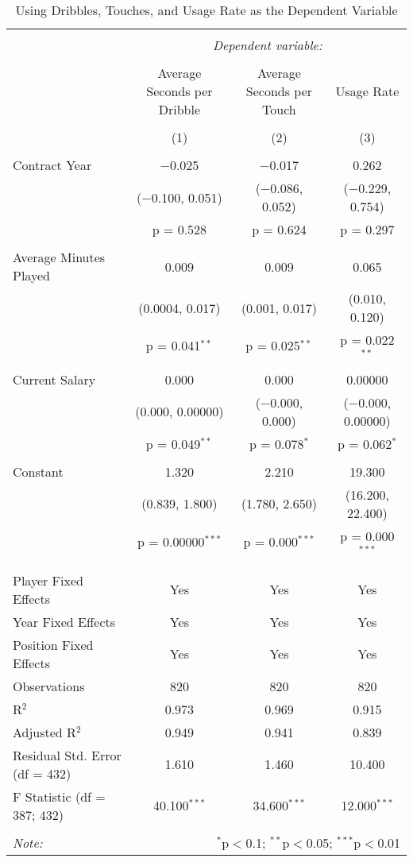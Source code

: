 \documentclass[12pt]{article}
\begin{document}
	\begin{sidewaystable}[!htbp] \centering 
		\caption{Using Dribbles, Touches, and Usage Rate as the Dependent Variable} 
		\label{} 
		\begin{tabular}{@{\extracolsep{5pt}}lccc} 
			\\[-1.8ex]\hline 
			\hline \\[-1.8ex] 
			& \multicolumn{3}{c}{\textit{Dependent variable:}} \\ 
			\cline{2-4} 
			\\[-1.8ex] & Average Seconds per Dribble & Average Seconds per Touch & Usage Rate \\ 
			\\[-1.8ex] & (1) & (2) & (3)\\ 
			\hline \\[-1.8ex] 
			Contract Year & $-$0.025 & $-$0.017 & 0.262 \\ 
			& ($-$0.100, 0.051) & ($-$0.086, 0.052) & ($-$0.229, 0.754) \\ 
			& p = 0.528 & p = 0.624 & p = 0.297 \\ 
			& & & \\ 
			Average Minutes Played & 0.009 & 0.009 & 0.065 \\ 
			& (0.0004, 0.017) & (0.001, 0.017) & (0.010, 0.120) \\ 
			& p = 0.041$^{**}$ & p = 0.025$^{**}$ & p = 0.022$^{**}$ \\ 
			& & & \\ 
			Current Salary & 0.000 & 0.000 & 0.00000 \\ 
			& (0.000, 0.00000) & ($-$0.000, 0.000) & ($-$0.000, 0.00000) \\ 
			& p = 0.049$^{**}$ & p = 0.078$^{*}$ & p = 0.062$^{*}$ \\ 
			& & & \\ 
			Constant & 1.320 & 2.210 & 19.300 \\ 
			& (0.839, 1.800) & (1.780, 2.650) & (16.200, 22.400) \\ 
			& p = 0.00000$^{***}$ & p = 0.000$^{***}$ & p = 0.000$^{***}$ \\ 
			& & & \\ 
			\hline \\[-1.8ex] 
			Player Fixed Effects & Yes & Yes & Yes \\ 
			Year Fixed Effects & Yes & Yes & Yes \\ 
			Position Fixed Effects & Yes & Yes & Yes \\ 
			Observations & 820 & 820 & 820 \\ 
			R$^{2}$ & 0.973 & 0.969 & 0.915 \\ 
			Adjusted R$^{2}$ & 0.949 & 0.941 & 0.839 \\ 
			Residual Std. Error (df = 432) & 1.610 & 1.460 & 10.400 \\ 
			F Statistic (df = 387; 432) & 40.100$^{***}$ & 34.600$^{***}$ & 12.000$^{***}$ \\ 
			\hline 
			\hline \\[-1.8ex] 
			\textit{Note:}  & \multicolumn{3}{r}{$^{*}$p$<$0.1; $^{**}$p$<$0.05; $^{***}$p$<$0.01} \\ 
		\end{tabular} 
	\end{sidewaystable} 
	
\end{document}
